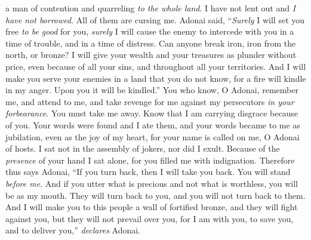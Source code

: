 \begin{biblechapter}
a man of contention and quarreling \textit{to the whole land}. 
I have not lent out and \textit{I have not borrowed}. 
All of them are cursing me.
\verse Adonai said,
\verse “\textit{Surely} I will set you free \textit{to be good} for you, 
\textit{surely} I will cause the enemy to intercede with you 
in a time of trouble, 
and in a time of distress.
\verse Can anyone break iron, 
iron from the north, or bronze?
\verse I will give your wealth and your treasures 
as plunder without price, 
even because of all your sins, 
and throughout all your territories.
\verse And I will make you serve your enemies 
in a land that you do not know, 
for a fire will kindle in my anger. 
Upon you it will be kindled.”
\verse You who know, O Adonai, remember me, and attend to me, 
and take revenge for me against my persecutors \textit{in your forbearance}. 
You must take me away. 
Know that I am carrying disgrace because of you.
\verse Your words were found and I ate them, 
and your words became to me as jubilation, 
even as the joy of my heart, 
for your name is called on me, O Adonai of hosts.
\verse I sat not in the assembly of jokers, 
nor did I exult. 
Because of the \textit{presence} of your hand I sat alone, 
for you filled me with indignation.
\verse Therefore thus says Adonai,
\verse “If you turn back, then I will take you back. 
You will stand \textit{before me}. 
And if you utter what is precious and not what is worthless, 
you will be as my mouth. 
They will turn back to you, 
and you will not turn back to them.
\verse And I will make you to this people 
a wall of fortified bronze, 
and they will fight against you, 
but they will not prevail over you, 
for I am with you, to save you, 
and to deliver you,” \textit{declares} Adonai.
\end{biblechapter}

